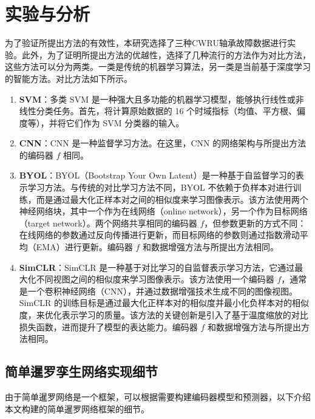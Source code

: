 \documentclass[master]{thesis-uestc}
\begin{document}
\section{实验与分析}
为了验证所提出方法的有效性，本研究选择了三种CWRU轴承故障数据进行实验。此外，为了证明所提出方法的优越性，选择了几种流行的方法作为对比方法，这些方法可以分为两类。一类是传统的机器学习算法，另一类是当前基于深度学习的智能方法。对比方法如下所示。
\begin{enumerate}[label={(\arabic*)}]
    \item \textbf{SVM}：多类 SVM 是一种强大且多功能的机器学习模型，能够执行线性或非线性分类任务。首先，将计算原始数据的 16 个时域指标（均值、平方根、偏度等），并将它们作为 SVM 分类器的输入。

    \item \textbf{CNN}：CNN 是一种监督学习方法。在这里，CNN 的网络架构与所提出方法的编码器 \(f\) 相同。

    \item \textbf{BYOL}：BYOL（Bootstrap Your Own Latent）是一种基于自监督学习的表示学习方法。与传统的对比学习方法不同，BYOL 不依赖于负样本对进行训练，而是通过最大化正样本对之间的相似度来学习图像表示。该方法使用两个神经网络块，其中一个作为在线网络（online network），另一个作为目标网络（target network）。两个网络共享相同的编码器 \(f\)，但参数更新的方式不同：在线网络的参数通过反向传播进行更新，而目标网络的参数则通过指数滑动平均（EMA）进行更新。编码器 \(f\) 和数据增强方法与所提出方法相同。
    
    \item \textbf{SimCLR}：SimCLR 是一种基于对比学习的自监督表示学习方法，它通过最大化不同视图之间的相似度来学习图像表示。该方法使用一个编码器 \(f\)，通常是一个卷积神经网络（CNN），并通过数据增强技术生成不同的图像视图。SimCLR 的训练目标是通过最大化正样本对的相似度并最小化负样本对的相似度，来优化表示学习的质量。该方法的关键创新是引入了基于温度缩放的对比损失函数，进而提升了模型的表达能力。编码器 \(f\) 和数据增强方法与所提出方法相同。

\end{enumerate}
\subsection{简单暹罗孪生网络实现细节}
由于简单暹罗网络是一个框架，可以根据需要构建编码器模型和预测器，以下介绍本文构建的简单暹罗网络框架的细节。
\end{document}
